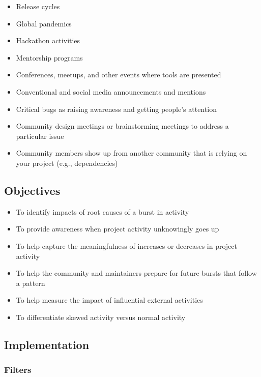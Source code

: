 \documentclass[
  12pt,
]{article}
\providecommand{\tightlist}{%
  \setlength{\itemsep}{0pt}\setlength{\parskip}{0pt}}
\begin{document}
\begin{itemize}
\tightlist
\item
  Release cycles
\item
  Global pandemics
\item
  Hackathon activities
\item
  Mentorship programs
\item
  Conferences, meetups, and other events where tools are presented
\item
  Conventional and social media announcements and mentions
\item
  Critical bugs as raising awareness and getting people's attention
\item
  Community design meetings or brainstorming meetings to address a
  particular issue
\item
  Community members show up from another community that is relying on
  your project (e.g., dependencies)
\end{itemize}

\hypertarget{objectives-3}{%
\subsection{Objectives}\label{objectives-3}}

\begin{itemize}
\tightlist
\item
  To identify impacts of root causes of a burst in activity
\item
  To provide awareness when project activity unknowingly goes up
\item
  To help capture the meaningfulness of increases or decreases in
  project activity
\item
  To help the community and maintainers prepare for future bursts that
  follow a pattern
\item
  To help measure the impact of influential external activities
\item
  To differentiate skewed activity versus normal activity
\end{itemize}

\hypertarget{implementation-3}{%
\subsection{Implementation}\label{implementation-3}}

\hypertarget{filters-2}{%
\subsubsection{Filters}\label{filters-2}}
\end{document}
